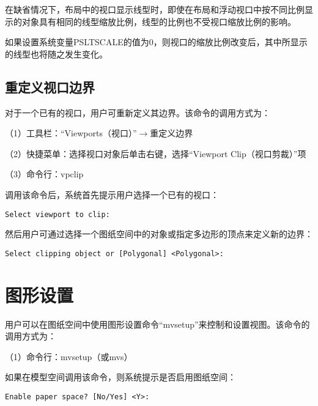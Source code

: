 在缺省情况下，布局中的视口显示线型时，即使在布局和浮动视口中按不同比例显示的对象具有相同的线型缩放比例，线型的比例也不受视口缩放比例的影响。

如果设置系统变量PSLTSCALE的值为0，则视口的缩放比例改变后，其中所显示的线型也将随之发生变化。

\section{重定义视口边界}

对于一个已有的视口，用户可重新定义其边界。该命令的调用方式为：

（1）工具栏：“Viewports（视口）”$\to$重定义边界

（2）快捷菜单：选择视口对象后单击右键，选择“Viewport Clip（视口剪裁）”项

（3）命令行：vpclip

调用该命令后，系统首先提示用户选择一个已有的视口：

\begin{verbatim}
Select viewport to clip:
\end{verbatim}

然后用户可通过选择一个图纸空间中的对象或指定多边形的顶点来定义新的边界：

\begin{verbatim}
Select clipping object or [Polygonal] <Polygonal>:
\end{verbatim}


\chapter{图形设置}

用户可以在图纸空间中使用图形设置命令“mvsetup”来控制和设置视图。该命令的调用方式为：

（1）命令行：mvsetup（或mvs）

如果在模型空间调用该命令，则系统提示是否启用图纸空间：

\begin{verbatim}
Enable paper space? [No/Yes] <Y>:
\end{verbatim}


